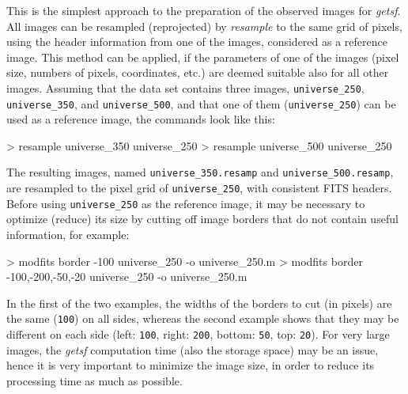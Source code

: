 \documentclass[a4paper,10pt]{article}
\begin{document}
This is the simplest approach to the preparation of the observed images for \textsl{getsf}. All images can be resampled
(reprojected) by \textsl{resample} to the same grid of pixels, using the header information from one of the images, considered as a
reference image. This method can be applied, if the parameters of one of the images (pixel size, numbers of pixels, coordinates,
etc.) are deemed suitable also for all other images. Assuming that the data set contains three images, \verb!universe_250!,
\verb!universe_350!, and \verb!universe_500!, and that one of them (\verb!universe_250!) can be used as a reference image, the
commands look like this:
\begin{verbnobox}[\mbox{}\small]
> resample universe_350 universe_250
> resample universe_500 universe_250
\end{verbnobox}
The resulting images, named \verb!universe_350.resamp! and \verb!universe_500.resamp!, are resampled to the pixel grid of
\verb!universe_250!, with consistent FITS headers. Before using \verb!universe_250! as the reference image, it may be necessary to
optimize (reduce) its size by cutting off image borders that do not contain useful information, for example:
\begin{verbnobox}[\mbox{}\small]
> modfits border -100 universe_250 -o universe_250.m
> modfits border -100,-200,-50,-20 universe_250 -o universe_250.m
\end{verbnobox}
In the first of the two examples, the widths of the borders to cut (in pixels) are the same (\verb!100!) on all sides, whereas the
second example shows that they may be different on each side (left: \verb!100!, right: \verb!200!, bottom: \verb!50!, top:
\verb!20!). For very large images, the \textsl{getsf} computation time (also the storage space) may be an issue, hence it is very
important to minimize the image size, in order to reduce its processing time as much as possible.

\end{document}
